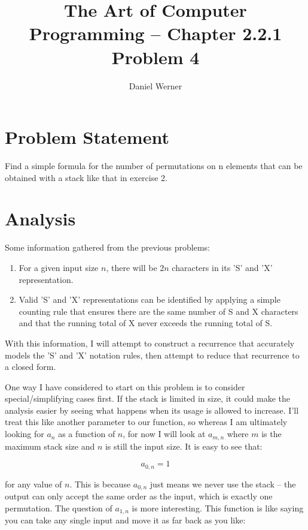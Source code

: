 \documentclass{article}
\title{The Art of Computer Programming -- Chapter 2.2.1 Problem 4}
\author{Daniel Werner}
\begin{document}
\maketitle

\section*{
    Problem Statement
}

Find a simple formula for the number of permutations on n elements that can be obtained with a stack like that in exercise 2.

\section*{
    Analysis
}

Some information gathered from the previous problems:
\begin{enumerate}
  \item For a given input size $n$, there will be $2n$ characters in its 'S' and 'X' representation.
  \item Valid 'S' and 'X' representations can be identified by applying a simple counting rule that ensures there are the same number of S and X characters and that the running total of X never exceeds the running total of S.
\end{enumerate}

With this information, I will attempt to construct a recurrence that accurately models the 'S' and 'X' notation rules, then attempt to reduce that recurrence to a closed form.

\par

One way I have considered to start on this problem is to consider special/simplifying cases first.  If the stack is limited in size, it could make the analysis easier by seeing what happens when its usage is allowed to increase.  I'll treat this like another parameter to our function, so whereas I am ultimately looking for $a_n$ as a function of $n$, for now I will look at $a_{m,n}$ where $m$ is the maximum stack size and $n$ is still the input size.  It is easy to see that:

\begin{equation*}
  a_{0,n} = 1
\end{equation*}

for any value of $n$.  This is because $a_{0,n}$ just means we never use the stack -- the output can only accept the same order as the input, which is exactly one permutation.  The question of $a_{1,n}$ is more interesting.  This function is like saying you can take any single input and move it as far back as you like:
\end{document}
